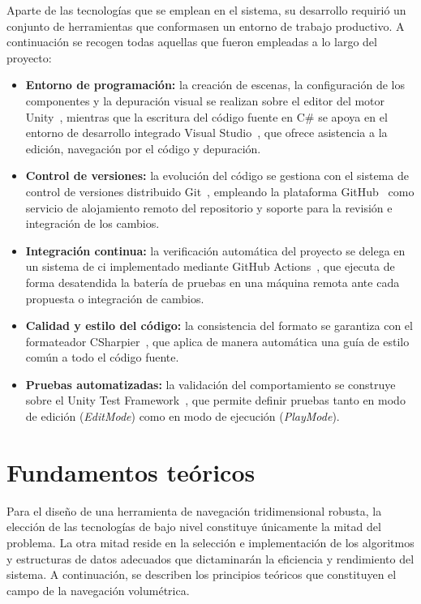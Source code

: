 Aparte de las tecnologías que se emplean en el sistema, su desarrollo requirió un conjunto de herramientas que conformasen un entorno de trabajo productivo.
A continuación se recogen todas aquellas que fueron empleadas a lo largo del proyecto:

\begin{itemize}
    \item \textbf{Entorno de programación:} la creación de escenas, la configuración de los componentes y la depuración visual se realizan sobre el editor del motor Unity~\cite{unity}, mientras que la escritura del código fuente en C\# se apoya en el entorno de desarrollo integrado Visual Studio~\cite{visualstudio}, que ofrece asistencia a la edición, navegación por el código y depuración.
    \item \textbf{Control de versiones:} la evolución del código se gestiona con el sistema de control de versiones distribuido Git~\cite{git}, empleando la plataforma GitHub~\cite{github} como servicio de alojamiento remoto del repositorio y soporte para la revisión e integración de los cambios.
    \item \textbf{Integración continua:} la verificación automática del proyecto se delega en un sistema de \acrfull{ci} implementado mediante GitHub Actions~\cite{githubactions}, que ejecuta de forma desatendida la batería de pruebas en una máquina remota ante cada propuesta o integración de cambios.
    \item \textbf{Calidad y estilo del código:} la consistencia del formato se garantiza con el formateador CSharpier~\cite{csharpier}, que aplica de manera automática una guía de estilo común a todo el código fuente.
    \item \textbf{Pruebas automatizadas:} la validación del comportamiento se construye sobre el Unity Test Framework~\cite{unity_test_framework}, que permite definir pruebas tanto en modo de edición (\textit{EditMode}) como en modo de ejecución (\textit{PlayMode}).
\end{itemize}

\section{Fundamentos teóricos}

Para el diseño de una herramienta de navegación tridimensional robusta, la elección de las tecnologías de bajo nivel constituye únicamente la mitad del problema.
La otra mitad reside en la selección e implementación de los algoritmos y estructuras de datos adecuados que dictaminarán la eficiencia y rendimiento del sistema.
A continuación, se describen los principios teóricos que constituyen el campo de la navegación volumétrica.

